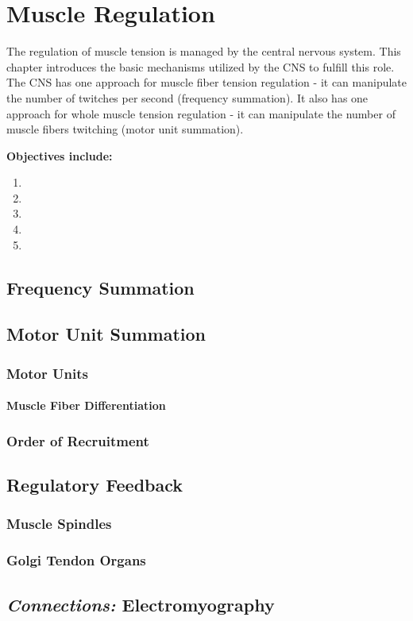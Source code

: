 \chapter{Muscle Regulation}\label{chp:regulation}

\minitoc
The regulation of muscle tension is managed by the central nervous system. This chapter introduces the basic mechanisms utilized by the CNS to fulfill this role. The CNS has one approach for muscle fiber tension regulation - it can manipulate the number of twitches per second (frequency summation). It also has one approach for whole muscle tension regulation - it can manipulate the number of muscle fibers twitching (motor unit summation). 

\vspace{5mm}

\textbf{Objectives include:}
\begin{enumerate}
    \item
    \item
    \item
    \item
    \item
\end{enumerate}

\section{Frequency Summation}

\section{Motor Unit Summation}

\subsection{Motor Units}

\subsubsection{Muscle Fiber Differentiation}

\subsection{Order of Recruitment}

\section{Regulatory Feedback}

\subsection{Muscle Spindles}

\subsection{Golgi Tendon Organs}

\section{\textit{Connections:} Electromyography}

\printbibliography[heading=subbibintoc]